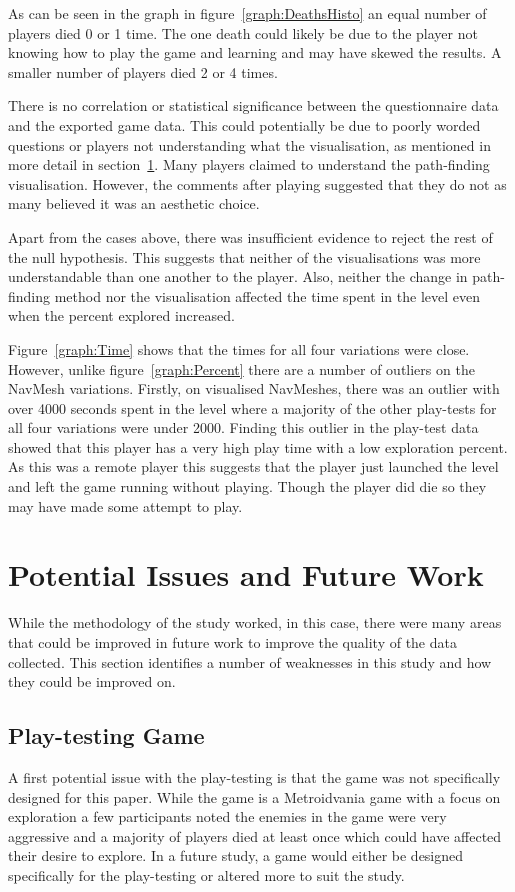 \documentclass[journal]{IEEEtran}
\begin{document}
	As can be seen in the graph in figure~\ref{graph:DeathsHisto} an equal number of players died 0 or 1 time. The one death could likely be due to the player not knowing how to play the game and learning and may have skewed the results. A smaller number of players died 2 or 4 times. 
	
	There is no correlation or statistical significance between the questionnaire data and the exported game data. This could potentially be due to poorly worded questions or players not understanding what the visualisation, as mentioned in more detail in section~\ref{PotentialIssues}. Many players claimed to understand the path-finding visualisation. However, the comments after playing suggested that they do not as many believed it was an aesthetic choice.
	
	Apart from the cases above, there was insufficient evidence to reject the rest of the null hypothesis. This suggests that neither of the visualisations was more understandable than one another to the player. Also, neither the change in path-finding method nor the visualisation affected the time spent in the level even when the percent explored increased.
	
	Figure~\ref{graph:Time} shows that the times for all four variations were close. However, unlike figure~\ref{graph:Percent} there are a number of outliers on the NavMesh variations. Firstly, on visualised NavMeshes, there was an outlier with over 4000 seconds spent in the level where a majority of the other play-tests for all four variations were under 2000. Finding this outlier in the play-test data showed that this player has a very high play time with a low exploration percent. As this was a remote player this suggests that the player just launched the level and left the game running without playing. Though the player did die so they may have made some attempt to play.
	
	
	\section{Potential Issues and Future Work} \label{PotentialIssues}
	While the methodology of the study worked, in this case, there were many areas that could be improved in future work to improve the quality of the data collected. This section identifies a number of weaknesses in this study and how they could be improved on. 
	
	\subsection{Play-testing Game} 
	A first potential issue with the play-testing is that the game was not specifically designed for this paper. While the game is a Metroidvania game with a focus on exploration a few participants noted the enemies in the game were very aggressive and a majority of players died at least once which could have affected their desire to explore. In a future study, a game would either be designed specifically for the play-testing or altered more to suit the study.  
	
\end{document}
